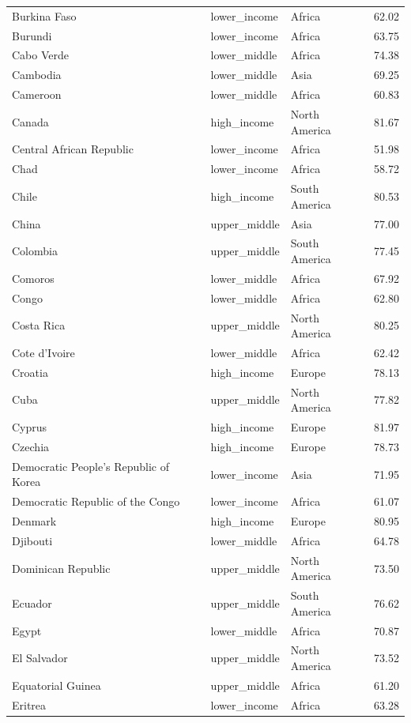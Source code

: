 \documentclass[
  letterpaper,
  DIV=11,
  numbers=noendperiod]{scrartcl}
\begin{document}
\begin{longtable}[t]{llll}
\addlinespace
Burkina Faso & lower\_income & Africa & 62.02\\
Burundi & lower\_income & Africa & 63.75\\
Cabo Verde & lower\_middle & Africa & 74.38\\
Cambodia & lower\_middle & Asia & 69.25\\
Cameroon & lower\_middle & Africa & 60.83\\
\addlinespace
Canada & high\_income & North America & 81.67\\
Central African Republic & lower\_income & Africa & 51.98\\
Chad & lower\_income & Africa & 58.72\\
Chile & high\_income & South America & 80.53\\
China & upper\_middle & Asia & 77.00\\
\addlinespace
Colombia & upper\_middle & South America & 77.45\\
Comoros & lower\_middle & Africa & 67.92\\
Congo & lower\_middle & Africa & 62.80\\
Costa Rica & upper\_middle & North America & 80.25\\
Cote d'Ivoire & lower\_middle & Africa & 62.42\\
\addlinespace
Croatia & high\_income & Europe & 78.13\\
Cuba & upper\_middle & North America & 77.82\\
Cyprus & high\_income & Europe & 81.97\\
Czechia & high\_income & Europe & 78.73\\
Democratic People's Republic of Korea & lower\_income & Asia & 71.95\\
\addlinespace
Democratic Republic of the Congo & lower\_income & Africa & 61.07\\
Denmark & high\_income & Europe & 80.95\\
Djibouti & lower\_middle & Africa & 64.78\\
Dominican Republic & upper\_middle & North America & 73.50\\
Ecuador & upper\_middle & South America & 76.62\\
\addlinespace
Egypt & lower\_middle & Africa & 70.87\\
El Salvador & upper\_middle & North America & 73.52\\
Equatorial Guinea & upper\_middle & Africa & 61.20\\
Eritrea & lower\_income & Africa & 63.28\\

\end{longtable}
\end{document}
